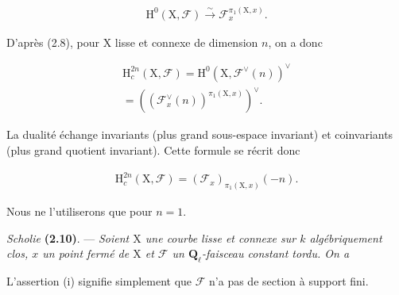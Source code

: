 \documentclass[10pt,leqno]{article}
\begin{document}
\begin{equation*}\begin{gathered}\mathrm{H}^{0}(\mathrm{X},\mathcal{F} ) \xrightarrow{\sim } \mathcal{F} _{x}^{\pi _{1}(\mathrm{X},x)}.\end{gathered}\tag{2.9.1}\end{equation*}

\noindent D’après (2.8), pour \(\mathrm{X}\) lisse et connexe de dimension \(n\), on a donc\par

\begin{equation*}\begin{gathered}\mathrm{H}_{c}^{2n}(\mathrm{X},\mathcal{F} ) = \mathrm{H}^{0}(\mathrm{X},\mathcal{F} ^{\vee }(n))^{\vee } \\ = ((\mathcal{F} _{x}^{\vee }(n))^{\pi _{1}(\mathrm{X},x)})^{\vee }.\end{gathered}\end{equation*}

\noindent La dualité échange invariants (plus grand sous-espace invariant) et coinvariants (plus grand quotient invariant). Cette formule se récrit donc\par

\begin{equation*}\begin{gathered}\mathrm{H}_{c}^{2n}(\mathrm{X},\mathcal{F} ) = (\mathcal{F} _{x})_{\pi _{1}(\mathrm{X},x)}(- n).\end{gathered}\end{equation*}

\noindent Nous ne l’utiliserons que pour \(n=1\).\par

\noindent \emph{Scholie} \textbf{(2.10)}. — {\itshape Soient \(\mathrm{X}\) une courbe lisse et connexe sur \(k\) algébriquement clos, \(x\) un point fermé de \(\mathrm{X}\) et \(\mathcal{F} \) un \(\mathbf{Q}_{\ell }\)-faisceau constant tordu. On a}\par

\par

\noindent L’assertion (i) signifie simplement que \(\mathcal{F} \) n’a pas de section à support fini.\par
\end{document}

